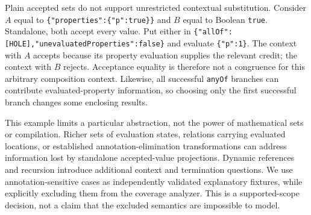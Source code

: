 \documentclass[sigconf,nonacm]{acmart}
\begin{document}
Plain accepted sets do not support unrestricted contextual substitution. Consider $A$ equal to \texttt{\{\allowbreak{}"\allowbreak{}p\allowbreak{}r\allowbreak{}o\allowbreak{}p\allowbreak{}e\allowbreak{}r\allowbreak{}t\allowbreak{}i\allowbreak{}e\allowbreak{}s\allowbreak{}"\allowbreak{}:\allowbreak{}\{\allowbreak{}"\allowbreak{}p\allowbreak{}"\allowbreak{}:\allowbreak{}t\allowbreak{}r\allowbreak{}u\allowbreak{}e\allowbreak{}\}\allowbreak{}\}} and $B$ equal to Boolean \texttt{t\allowbreak{}r\allowbreak{}u\allowbreak{}e}. Standalone, both accept every value. Put either in \texttt{\{\allowbreak{}"\allowbreak{}a\allowbreak{}l\allowbreak{}l\allowbreak{}O\allowbreak{}f\allowbreak{}"\allowbreak{}:\allowbreak{}[\allowbreak{}H\allowbreak{}O\allowbreak{}L\allowbreak{}E\allowbreak{}]\allowbreak{},\allowbreak{}"\allowbreak{}u\allowbreak{}n\allowbreak{}e\allowbreak{}v\allowbreak{}a\allowbreak{}l\allowbreak{}u\allowbreak{}a\allowbreak{}t\allowbreak{}e\allowbreak{}d\allowbreak{}P\allowbreak{}r\allowbreak{}o\allowbreak{}p\allowbreak{}e\allowbreak{}r\allowbreak{}t\allowbreak{}i\allowbreak{}e\allowbreak{}s\allowbreak{}"\allowbreak{}:\allowbreak{}f\allowbreak{}a\allowbreak{}l\allowbreak{}s\allowbreak{}e\allowbreak{}\}} and evaluate \texttt{\{\allowbreak{}"\allowbreak{}p\allowbreak{}"\allowbreak{}:\allowbreak{}1\allowbreak{}\}}. The context with $A$ accepts because its property evaluation supplies the relevant credit; the context with $B$ rejects. Acceptance equality is therefore not a congruence for this arbitrary composition context. Likewise, all successful \texttt{a\allowbreak{}n\allowbreak{}y\allowbreak{}O\allowbreak{}f} branches can contribute evaluated-property information, so choosing only the first successful branch changes some enclosing results. \cite{ref9}

This example limits a particular abstraction, not the power of mathematical sets or compilation. Richer sets of evaluation states, relations carrying evaluated locations, or established annotation-elimination transformations can address information lost by standalone accepted-value projections. Dynamic references and recursion introduce additional context and termination questions. We use annotation-sensitive cases as independently validated explanatory fixtures, while explicitly excluding them from the coverage analyzer. This is a supported-scope decision, not a claim that the excluded semantics are impossible to model. \cite{ref7,ref8}
\end{document}
